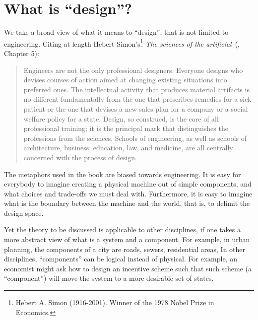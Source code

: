 
\section{What is ``design''?}
\label{sec:design-what-is-design}


We take a broad view of what it means to ``design'', that is not limited to engineering.
Citing at length Hebert Simon's\footnote{Hebert A.
    Simon (1916-2001).
    Winner of the 1978 Nobel Prize in Economics.
}
\emph{The sciences of the artificial}~(\cite{hebert96sciences}, Chapter 5):

\begin{quote}
    Engineers are not the only professional designers.
    Everyone designs who devises courses of action aimed at changing existing situations into preferred ones.
    The intellectual activity that produces material artifacts is no different fundamentally from the one that prescribes remedies for a sick patient or the one that devises a new sales plan for a company or a social welfare policy for a state.
    Design, so construed, is the core of all professional training;
    it is the principal mark that distinguishes the professions from the sciences.
    Schools of engineering, as well as schools of architecture, business, education, law, and medicine, are all centrally concerned with the process of design.
\end{quote}

The metaphors used in the book are biased towards engineering.
It is easy for everybody to imagine creating a physical machine out of simple components, and what choices and trade-offs we must deal with.
Furthermore, it is easy to imagine what is the boundary between the machine and the world, that is, to delimit the design space.

Yet the theory to be discussed is applicable to other disciplines, if one takes a more abstract view of what is a system and a component.
For example, in urban planning, the components of a city are roads, sewers, residential areas, \etc
In other disciplines, ``components'' can be logical instead of physical.
For example, an economist might ask how to design an incentive scheme such that such scheme (a ``component'') will move the system to a more desirable set of states.
